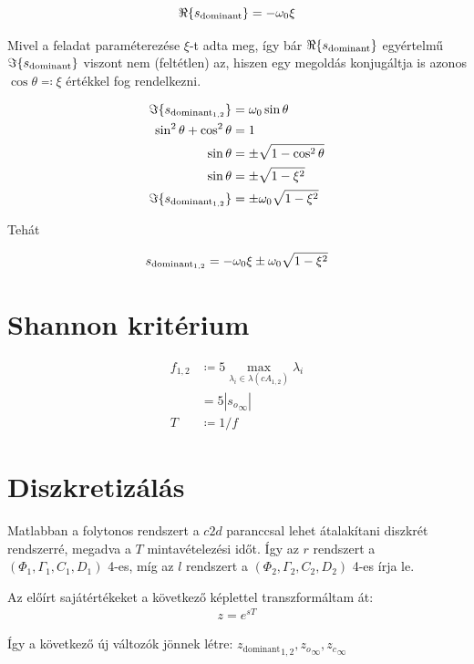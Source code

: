 \documentclass{article}
\begin{document}
	\begin{equation}
		\Re\{s_{\textrm{dominant}}\} = -\omega_0\xi
	\end{equation}

	Mivel a feladat paraméterezése $\xi$-t adta meg, így bár $\Re\{s_{\textrm{dominant}}\}$ egyértelmű $\Im\{s_{\textrm{dominant}}\}$ viszont nem (feltétlen) az, hiszen egy megoldás konjugáltja is azonos $\cos{\theta} \eqqcolon \xi$ értékkel fog rendelkezni.
	
	\begin{align}
		\Im\{s_{\textrm{dominant}_{1,2}}\} & = \omega_0\sin{\theta} \\
		\sin^2{\theta} + \cos^2{\theta} & = 1 \\
		\sin{\theta} & = \pm \sqrt{1 - \cos^2{\theta}} \\
		\sin{\theta} & = \pm \sqrt{1 - \xi^2} \\
		\Im\{s_{\textrm{dominant}_{1,2}}\} & = \pm \omega_0 \sqrt{1 - \xi^2}
	\end{align}

	Tehát

	\begin{align}
		s_{\textrm{dominant}_{1,2}} = -\omega_0\xi \pm \omega_0 \sqrt{1 - \xi^2}
	\end{align}
\section{Shannon kritérium}
    \newcommand{\soinf}{{s_o}_{\infty}}
    \newcommand{\scinf}{{s_c}_{\infty}}

	\begin{align}
		f_{1,2} & \coloneqq 5 \max_{ \lambda_i \in \lambda(cA_{1,2}) } \lambda_i \\
		& =
		5 |\soinf| \\
		T & \coloneqq 1/f
	\end{align}

\section{Diszkretizálás}
	Matlabban a folytonos rendszert a $c2d$ paranccsal lehet átalakítani diszkrét rendszerré, megadva a $T$ mintavételezési időt. Így az $r$ rendszert a $(\Phi_1, \Gamma_1, C_1, D_1)$ 4-es, míg az $l$ rendszert a $(\Phi_2, \Gamma_2, C_2, D_2)$ 4-es írja le.

	Az előírt sajátértékeket a következő képlettel transzformáltam át:
	\begin{align}
		z = e^{s T}
	\end{align}

    \newcommand{\zoinf}{ {{z_o}_{\infty}} }
    \newcommand{\zcinf}{ {{z_c}_{\infty}} }
	\newcommand{\zdom}{ {z_{\textrm{dominant}}} }
    Így a következő új változók jönnek létre: $\zdom_{1,2}, \zoinf, \zcinf$
\end{document}
